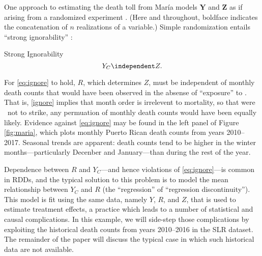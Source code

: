 One approach to estimating the death toll from
Mar\'{i}a models $\bm{Y}$ and $\bm{Z}$ as if arising from a randomized
experiment \citep[see, e.g.][for anlogues in the RDD literature]{cattaneo2015randomization,matteiMealliObsStud}.
(Here and throughout, boldface indicates the concatenation of
$n$ realizations of a variable.)
Simple randomization entails ``strong ignorability''
\citep[e.g.][]{rosenbaum1983central}:
\begin{ass}{Strong Ignorability}
\begin{equation}\label{eq:ignore}
Y_{C} \independent Z.
\end{equation}
\end{ass}
For \eqref{eq:ignore} to hold, $R$, which determines $Z$, must be
independent of monthly death counts that would have been observed in
the absense of ``exposure'' to \maria.
That is, \eqref{ignore} implies that month order is irrelevent
to mortality, so that were \maria\ not to strike, any permuation of
monthly death counts would have been equally likely.
Evidence against \eqref{eq:ignore} may be found in the left panel of Figure
\ref{fig:maria}, which plots monthly Puerto Rican death counts from
years 2010--2017.
Seasonal trends are apparent: death counts tend to be higher in the winter
months---particularly Decenber and January---than during the rest of
the year.

Dependence between $R$ and $Y_C$---and hence violations of
\eqref{eq:ignore}---is common in RDDs, and the typical solution to
this problem is to model the mean relationship between $Y_C$ and $R$
(the ``regression'' of ``regression discontinuity'').
This model is fit using the same data, namely $Y$, $R$, and $Z$, that
is used to estimate treatment effects, a practice which leads to a
number of statistical and causal complications.
In this example, we will side-step those complications by exploiting
the historical death counts from years 2010--2016 in the SLR dataset.
The remainder of the paper will discuss the typical case in which such
historical data are not available.

